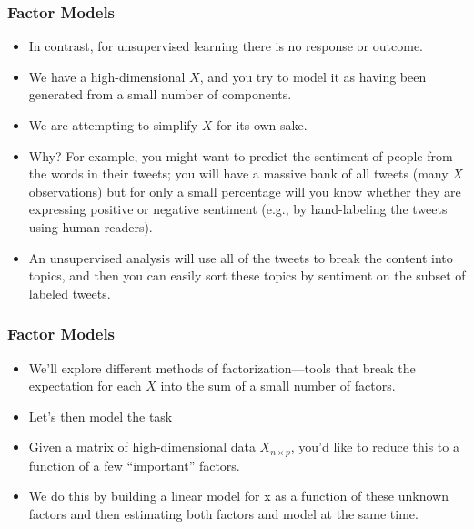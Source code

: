 \documentclass[
  shownotes,
  xcolor={svgnames},
  hyperref={colorlinks,citecolor=DarkBlue,linkcolor=DarkRed,urlcolor=DarkBlue}
  , aspectratio=169]{beamer}
\begin{document}
\begin{frame}
\frametitle{Factor Models}

\begin{itemize}

 \item In contrast, for unsupervised learning there is no response or outcome. 
 \medskip
 \item We have a high-dimensional $X$, and you try to model it as having been generated from a small number of components. 
 \medskip
 \item We are attempting to simplify $X$ for its own sake. 
 \medskip
 \item Why? For example, you might want to predict the sentiment of people from the words in their tweets; you will have a massive bank of all tweets (many $X$ observations) but for only a small percentage will you know whether they are expressing positive or negative sentiment (e.g., by hand-labeling the tweets using human readers). 
 \medskip
 \item An unsupervised analysis will use all of the tweets to break the content into topics, and then you can easily sort these topics by sentiment on the subset of labeled tweets. 

\end{itemize}
\end{frame}
\begin{frame}
\frametitle{Factor Models}

\begin{itemize}

 \item We’ll explore different methods of factorization—tools that break the expectation for each $X$ into the sum of a small number of factors.
\medskip
\item Let's then model the task
\medskip
\pause
\item Given a matrix of high-dimensional data $X_{n\times p}$, you’d like to reduce this to a function of a few “important” factors. 

\item We do this by building a linear model for x as a function of these unknown factors and then estimating both factors and model at the same time.


\end{itemize}
\end{frame}
\end{document}
